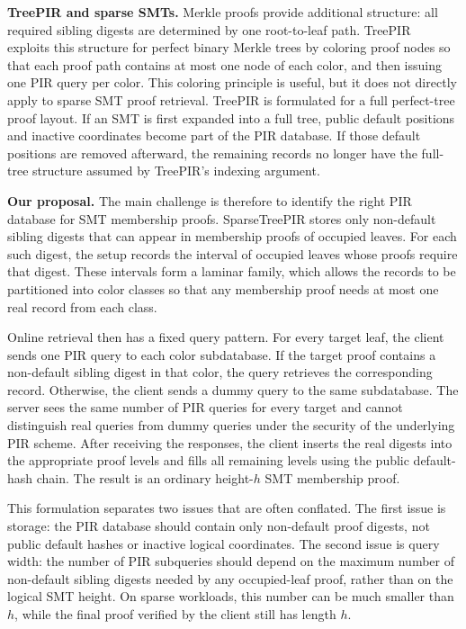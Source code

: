 \textbf{TreePIR and sparse SMTs.} Merkle proofs provide additional structure: all required sibling digests are determined by one root-to-leaf path. TreePIR~\cite{treepir} exploits this structure for perfect binary Merkle trees by coloring proof nodes so that each proof path contains at most one node of each color, and then issuing one PIR query per color. This coloring principle is useful, but it does not directly apply to sparse SMT proof retrieval. TreePIR is formulated for a full perfect-tree proof layout. If an SMT is first expanded into a full tree, public default positions and inactive coordinates become part of the PIR database. If those default positions are removed afterward, the remaining records no longer have the full-tree structure assumed by TreePIR's indexing argument.

\textbf{Our proposal.} The main challenge is therefore to identify the right PIR database for SMT membership proofs. SparseTreePIR stores only non-default sibling digests that can appear in membership proofs of occupied leaves. For each such digest, the setup records the interval of occupied leaves whose proofs require that digest. These intervals form a laminar family, which allows the records to be partitioned into color classes so that any membership proof needs at most one real record from each class.

Online retrieval then has a fixed query pattern. For every target leaf, the client sends one PIR query to each color subdatabase. If the target proof contains a non-default sibling digest in that color, the query retrieves the corresponding record. Otherwise, the client sends a dummy query to the same subdatabase. The server sees the same number of PIR queries for every target and cannot distinguish real queries from dummy queries under the security of the underlying PIR scheme. After receiving the responses, the client inserts the real digests into the appropriate proof levels and fills all remaining levels using the public default-hash chain. The result is an ordinary height-$h$ SMT membership proof.

This formulation separates two issues that are often conflated. The first issue is storage: the PIR database should contain only non-default proof digests, not public default hashes or inactive logical coordinates. The second issue is query width: the number of PIR subqueries should depend on the maximum number of non-default sibling digests needed by any occupied-leaf proof, rather than on the logical SMT height. On sparse workloads, this number can be much smaller than $h$, while the final proof verified by the client still has length $h$.

